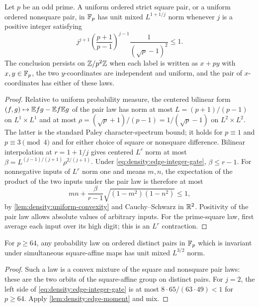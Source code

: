 \begin{lemma}\label{lem:density:edge-moment}
Let $p$ be an odd prime. A uniform ordered strict square pair, or a
uniform ordered nonsquare pair, in $\mathbb F_p$ has unit mixed $L^{1+1/j}$ norm
whenever $j$ is a positive integer satisfying
\begin{equation}\label{eq:density:edge-integer-gate}
 j^{j+1}\left(\frac{p+1}{p-1}\right)^{j-1}
 \frac1{(\sqrt p-1)^2}\le1.
\end{equation}
The conclusion persists on $\mathbb Z/p^2\mathbb Z$ when each label is written as $x+py$ with $x,y\in\mathbb F_p$, the two $y$-coordinates are independent and uniform, and the pair of $x$-coordinates has either of these laws.
\end{lemma}
\begin{proof}
Relative to uniform probability measure, the centered bilinear form $(f,g)\mapsto\mathbb E fg-\mathbb E f\mathbb E g$ of the pair law has norm at most $L=(p+1)/(p-1)$ on $L^1\times L^1$ and at most $\rho=(\sqrt p+1)/(p-1)=1/(\sqrt p-1)$ on $L^2\times L^2$. The latter is the standard Paley
character-spectrum bound; it holds for $p\equiv1$ and $p\equiv3\pmod4$ and for either choice of square or nonsquare difference. Bilinear interpolation at $r=1+1/j$ gives centered
$L^r$ norm at most $\beta=L^{(j-1)/(j+1)}\rho^{2/(j+1)}$.
Under \eqref{eq:density:edge-integer-gate}, $\beta\le r-1$.
For nonnegative inputs of $L^r$ norm one and means $m,n$, the expectation of the product of the two inputs under the pair law is therefore at most
\[
 mn+\frac\beta{r-1}\sqrt{(1-m^2)(1-n^2)}\le1,
\]
by \cref{lem:density:uniform-convexity} and Cauchy--Schwarz in $\mathbb R^2$.
Positivity of the pair law allows absolute values of arbitrary inputs.
For the prime-square law, first average each input over its high digit;
this is an $L^r$ contraction.
\end{proof}

\begin{corollary}\label{lem:density:invariant-pair}
For $p\ge64$, any probability law on ordered distinct pairs in $\mathbb F_p$
which is invariant under simultaneous square-affine maps has unit mixed
$L^{3/2}$ norm.
\end{corollary}
\begin{proof}
Such a law is a convex mixture of the square and nonsquare pair laws:
these are the two orbits of the square-affine group on distinct pairs.
For $j=2$, the left side of \eqref{eq:density:edge-integer-gate} is at most
$8\cdot65/(63\cdot49)<1$ for $p\ge64$. Apply
\cref{lem:density:edge-moment} and mix.
\end{proof}

